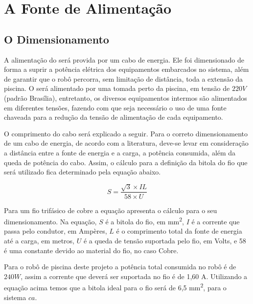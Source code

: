 \section{A Fonte de Alimentação}
\subsection{O Dimensionamento}
A alimentação do \cpr será provida por um cabo de energia. Ele foi dimensionado de forma a suprir a potência elétrica dos equipamentos embarcados no sistema, além de garantir que o robô percorra, sem limitação de distância, toda a extensão da piscina. O \cpr será alimentado por uma tomada perto da piscina, em tensão de $220V$ (padrão Brasília), entretanto, os diversos equipamentos intermos são alimentados em diferentes tensões, fazendo com que seja necessário o uso de uma fonte chaveada para a redução da tensão de alimentação de cada equipamento.

O comprimento do cabo será explicado a seguir. Para o correto dimensionamento de um cabo de energia, de acordo com a literatura, deve-se levar em consideração a distância entre a fonte de energia e a carga, a potência consumida, além da queda de potência do cabo. Assim, o cálculo para a definição da bitola do fio que será utilizado fica determinado pela equação abaixo.

\begin{equation} \label{eq:bitola}
  S = \frac{\sqrt{3} \times IL}{58 \times U}
\end{equation}

Para um fio trifásico de cobre a equação apresenta o cálculo para o seu dimensionamento. Na equação, $S$ é a bitola do fio, em \textsf{mm\textsuperscript{2}}, $I$ é a corrente que passa pelo condutor, em Ampères, $L$ é o comprimento total da fonte de energia até a carga, em metros, $U$ é a queda de tensão suportada pelo fio, em Volts, e 58 é uma constante devido ao material do fio, no caso Cobre.

Para o robô de piscina deste projeto a potência total consumida no robô é de $240W$, assim a corrente que deverá ser suportada no fio é de 1,60 A. Utilizando a equação acima temos que a bitola ideal para o fio será de 6,5 mm\textsuperscript{2}, para o sistema $ca$.

